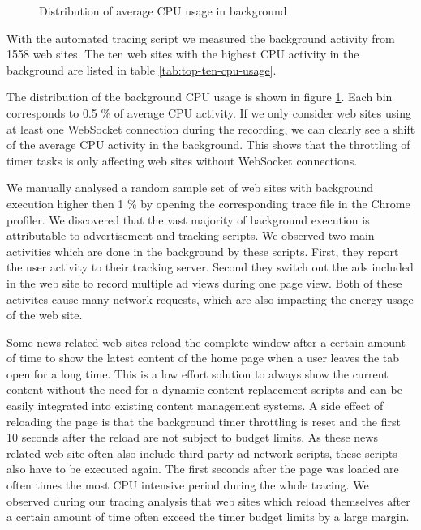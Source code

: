 \documentclass[
	ruledheaders=section,%
	class=report,%
	thesis={type=bachelor},%
	accentcolor=9c,%
	custommargins=true,%
	marginpar=false,%
	parskip=half-,%
	fontsize=11pt,%
]{tudapub}
\begin{document}
  \begin{figure}
    \centering
    
    \caption{Distribution of average CPU usage in background}
    \label{fig:distribution-cpu-usage}
  \end{figure}

  With the automated tracing script we measured the background activity from 1558 web sites. The ten web sites with the highest CPU activity in the background are listed in table \ref{tab:top-ten-cpu-usage}.

  The distribution of the background CPU usage is shown in figure \ref{fig:distribution-cpu-usage}. Each bin corresponds to 0.5 \% of average CPU activity. If we only consider web sites using at least one WebSocket connection during the recording, we can clearly see a shift of the average CPU activity in the background. This shows that the throttling of timer tasks is only affecting web sites without WebSocket connections.
  

  We manually analysed a random sample set of web sites with background execution higher then 1 \% by opening the corresponding trace file in the Chrome profiler. We discovered that the vast majority of background execution is attributable to advertisement and tracking scripts. We observed two main activities which are done in the background by these scripts. First, they report the user activity to their tracking server. Second they switch out the ads included in the web site to record multiple ad views during one page view. Both of these activites cause many network requests, which are also impacting the energy usage of the web site.
  
  Some news related web sites reload the complete window after a certain amount of time to show the latest content of the home page when a user leaves the tab open for a long time. This is a low effort solution to always show the current content without the need for a dynamic content replacement scripts and can be easily integrated into existing content management systems. A side effect of reloading the page is that the background timer throttling is reset and the first 10 seconds after the reload are not subject to budget limits. As these news related web site often also include third party ad network scripts, these scripts also have to be executed again. The first seconds after the page was loaded are often times the most CPU intensive period during the whole tracing. We observed during our tracing analysis that web sites which reload themselves after a certain amount of time often exceed the timer budget limits by a large margin.
\end{document}
